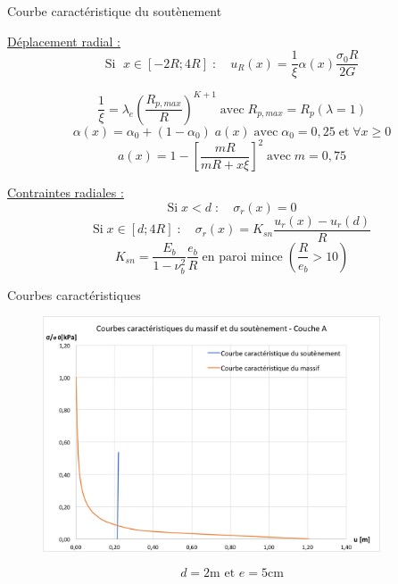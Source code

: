 \documentclass{beamer}
\begin{document}
\begin{frame}{Courbe caractéristique du soutènement}

\underline{Déplacement radial :}\\
\[\text{Si }\;x\in[-2R;4R]\;:\quad u_R(x)=\dfrac{1}{\xi}\alpha(x)\dfrac{\sigma_0R}{2G}\]\vspace{0.7cm}


\[\dfrac{1}{\xi} = \lambda_e\left(\dfrac{R_{p,max}}{R}\right)^{K+1}\;\text{avec}\;R_{p,max}=R_p(\lambda=1)\]
\[\alpha(x)=\alpha_0+(1-\alpha_0)\;a(x)\;\text{avec}\;\alpha_0=0,25\;\text{et}\;\forall x\geq0\]\[a(x)=1-\left[\dfrac{mR}{mR+x\xi}\right]^2\;\text{avec}\;m=0,75\]
    
\end{frame}


\begin{frame}
\underline{Contraintes radiales :}\\

\[\text{Si}\;x<d\;:\quad \sigma_r(x)=0\]
\[\text{Si}\;x\in[d;4R]\;:\quad \sigma_r(x)=K_{sn}\dfrac{u_r(x)-u_r(d)}{R}\]
\[K_{sn}=\dfrac{E_b}{1-\nu_b^2}\dfrac{e_b}{R}\;\text{en paroi mince}\;\left(\dfrac{R}{e_b}>10\right)\]
    
\end{frame}

\begin{frame}{Courbes caractéristiques}
    
\begin{figure}
\centering
\includegraphics[width=10cm]{sig_u_A2.png}
\end{figure}
\[d=2\text{m et }e=5\text{cm}\]
\end{frame}
\end{document}
